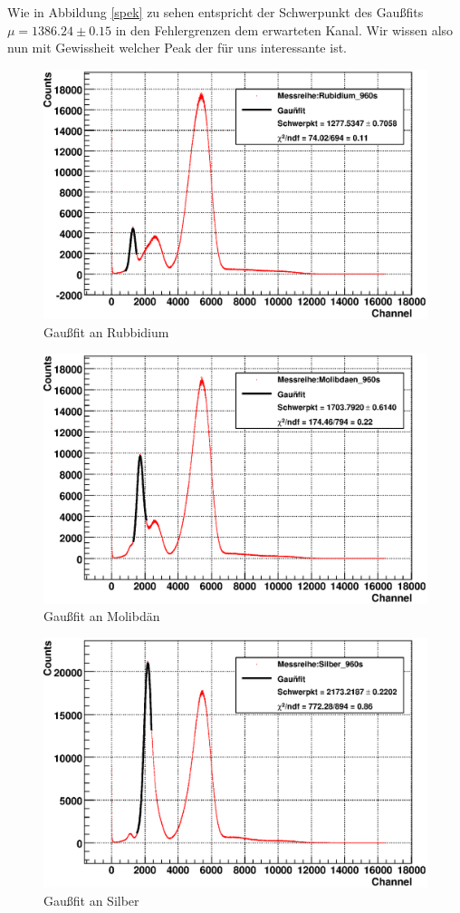\documentclass[12pt]{article}
\begin{document}
Wie in Abbildung \ref{spek} zu sehen entspricht der Schwerpunkt des Gaußfits $\mu=1386.24\pm0.15$ in den Fehlergrenzen dem erwarteten Kanal. Wir wissen also nun mit Gewissheit
welcher Peak der für uns interessante ist.

\begin{figure}[H]
 \includegraphics[width=0.9\linewidth]{pictures/eichung_rubidium.eps}
 \caption{Gaußfit an Rubbidium}
\end{figure}
\begin{figure}[H]
 \includegraphics[width=0.9\linewidth]{pictures/eichung_molibdaen.eps}
 \caption{Gaußfit an Molibdän}
\end{figure}
\begin{figure}[H]
 \includegraphics[width=0.9\linewidth]{pictures/eichung_silber.eps}
 \caption{Gaußfit an Silber}
\end{figure}
\end{document}
